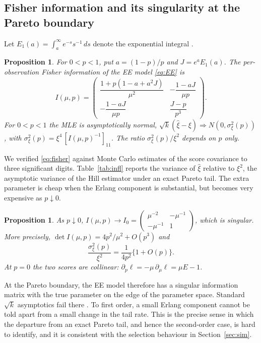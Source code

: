 \documentclass[12pt]{article}
\newtheorem{proposition}[theorem]{Proposition}
\theoremstyle{definition}
\theoremstyle{remark}
\begin{document}
\subsection{Fisher information and its singularity at the Pareto boundary}

Let $E_1(a)=\int_a^\infty e^{-s}s^{-1}\,ds$ denote the exponential integral \citep{AbramowitzStegun1964}.

\begin{proposition}\label{prop:fisher}
For $0<p<1$, put $a=(1-p)/p$ and $J=e^{a}E_1(a)$. The per-observation Fisher information of the EE model \eqref{eq:EE} is
\begin{equation}\label{eq:fisher}
I(\mu,p)=\begin{pmatrix}
\dfrac{1+p(1-a+a^2J)}{\mu^2} & -\dfrac{1-aJ}{\mu p}\\[2ex]
-\dfrac{1-aJ}{\mu p} & \dfrac{J-p}{p^{3}}
\end{pmatrix}.
\end{equation}
For $0<p<1$ the MLE is asymptotically normal, $\sqrt k(\hat\xi-\xi)\Rightarrow N(0,\sigma^2_\xi(p))$, with $\sigma^2_\xi(p)=\xi^4\,[I(\mu,p)^{-1}]_{11}$. The ratio $\sigma^2_\xi(p)/\xi^2$ depends on $p$ only.
\end{proposition}

We verified \eqref{eq:fisher} against Monte Carlo estimates of the score covariance to three significant digits. Table~\ref{tab:infl} reports the variance of $\hat\xi$ relative to $\xi^2$, the asymptotic variance of the Hill estimator under an exact Pareto tail. The extra parameter is cheap when the Erlang component is substantial, but becomes very expensive as $p\downarrow 0$.



\begin{proposition}\label{prop:singular}
As $p\downarrow0$, $I(\mu,p)\to I_0=\begin{pmatrix}\mu^{-2}&-\mu^{-1}\\-\mu^{-1}&1\end{pmatrix}$, which is singular. More precisely, $\det I(\mu,p)=4p^2/\mu^2+O(p^3)$ and
\begin{equation}\label{eq:blowup}
\frac{\sigma^2_\xi(p)}{\xi^2}=\frac{1}{4p^2}\{1+O(p)\}.
\end{equation}
At $p=0$ the two scores are collinear: $\partial_p\ell=-\mu\,\partial_\mu\ell=\mu E-1$.
\end{proposition}

At the Pareto boundary, the EE model therefore has a singular information matrix with the true parameter on the edge of the parameter space. Standard $\sqrt k$ asymptotics fail there \citep{SelfLiang1987,Rotnitzky2000}. To first order, a small Erlang component cannot be told apart from a small change in the tail rate. This is the precise sense in which the departure from an exact Pareto tail, and hence the second-order case, is hard to identify, and it is consistent with the selection behaviour in Section~\ref{sec:sim}.
\end{document}
